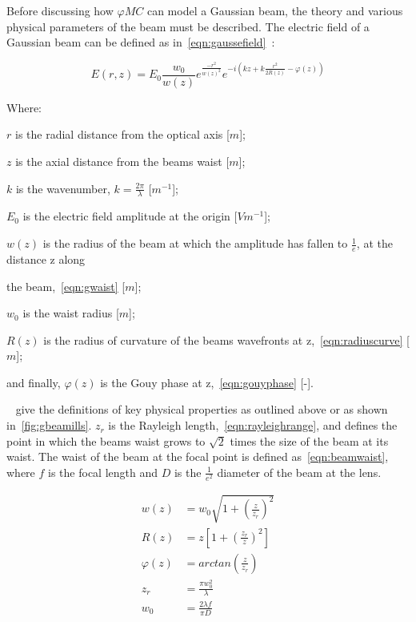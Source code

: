 Before discussing how $\varphi MC$ can model a Gaussian beam, the theory and various physical parameters of the beam must be described. 
The electric field of a Gaussian beam can be defined as in~\cref{eqn:gaussefield}~\cite{milonni2010laser}:

\begin{equation}
E(r,z)=E_0\frac{w_0}{w(z)}e^{\frac{-r^2}{w(z)^2}}e^{-i(kz+k\frac{r^2}{2R(z)}-\varphi(z))}
\label{eqn:gaussefield}
\end{equation}

\noindent Where:

    \indent $r$ is the radial distance from the optical axis [$m$];

    \indent $z$ is the axial distance from  the beams waist [$m$];

    \indent $k$ is the wavenumber, $k=\frac{2\pi}{\lambda}$ [$m^{-1}$];

    \indent $E_0$ is the electric field amplitude at the origin [$Vm^{-1}$];

    \indent $w(z)$ is the radius of the beam at which the amplitude has fallen to $\frac{1}{e}$, at the distance z along 

    \indent the beam,~\cref{eqn:gwaist} [$m$];

    \indent $w_0$ is the waist radius [$m$];

    \indent $R(z)$ is the radius of curvature of the beams wavefronts at z,~\cref{eqn:radiuscurve} [$m$];

    \indent and finally, $\varphi(z)$ is the Gouy phase at z,~\cref{eqn:gouyphase} [-].

\medskip

~ give the definitions of key physical properties as outlined above or as shown in~\cref{fig:gbeamills}. 
$z_r$ is the Rayleigh length,~\cref{eqn:rayleighrange}, and defines the point in which the beams waist grows to $\sqrt{2}$ times the size of the beam at its waist.
The waist of the beam at the focal point is defined as~\cref{eqn:beamwaist}, where $f$ is the focal length and $D$ is the $\tfrac{1}{e^2}$ diameter of the beam at the lens.

\begin{align}
    w(z) &= w_0\sqrt{1+\left(\frac{z}{z_r}\right)^2} \label{eqn:gwaist} \\
    R(z) &= z\left[1+\left(\frac{z_r}{z}\right)^2\right]\label{eqn:radiuscurve}\\
    \varphi(z) &= arctan\left(\frac{z}{z_r}\right)\label{eqn:gouyphase}\\
    z_r &= \frac{\pi w_0^2}{\lambda}\label{eqn:rayleighrange}\\
    w_0 &= \frac{2\lambda f}{\pi D}\label{eqn:beamwaist}\\
\end{align}

